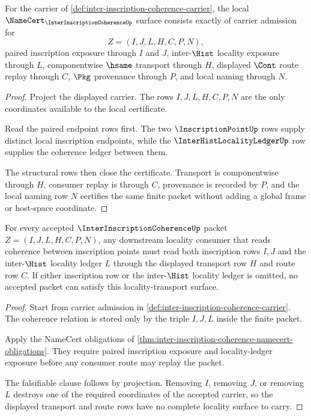 \begin{theorem}
\label{thm:inter-inscription-coherence-namecert-obligations}
For the carrier of \autoref{def:inter-inscription-coherence-carrier}, the local $\NameCert_{\InterInscriptionCoherenceUp}$ surface consists exactly of carrier admission for
$$
Z=(I,J,L,H,C,P,N),
$$
paired inscription exposure through $I$ and $J$, inter-$\Hist$ locality exposure through $L$, componentwise $\hsame$ transport through $H$, displayed $\Cont$ route replay through $C$, $\Pkg$ provenance through $P$, and local naming through $N$.
\end{theorem}
\begin{proof}
Project the displayed carrier. The rows $I,J,L,H,C,P,N$ are the only coordinates available to the local certificate.

Read the paired endpoint rows first. The two $\InscriptionPointUp$ rows supply distinct local inscription endpoints, while the $\InterHistLocalityLedgerUp$ row supplies the coherence ledger between them.

The structural rows then close the certificate. Transport is componentwise through $H$, consumer replay is through $C$, provenance is recorded by $P$, and the local naming row $N$ certifies the same finite packet without adding a global frame or host-space coordinate.
\end{proof}

\begin{theorem}
\label{thm:inter-inscription-coherence-locality-transport}
For every accepted $\InterInscriptionCoherenceUp$ packet $Z=(I,J,L,H,C,P,N)$, any downstream locality consumer that reads coherence between inscription points must read both inscription rows $I,J$ and the inter-$\Hist$ locality ledger $L$ through the displayed transport row $H$ and route row $C$. If either inscription row or the inter-$\Hist$ locality ledger is omitted, no accepted packet can satisfy this locality-transport surface.
\end{theorem}
\begin{proof}
Start from carrier admission in \autoref{def:inter-inscription-coherence-carrier}. The coherence relation is stored only by the triple $I,J,L$ inside the finite packet.

Apply the NameCert obligations of \autoref{thm:inter-inscription-coherence-namecert-obligations}. They require paired inscription exposure and locality-ledger exposure before any consumer route may replay the packet.

The falsifiable clause follows by projection. Removing $I$, removing $J$, or removing $L$ destroys one of the required coordinates of the accepted carrier, so the displayed transport and route rows have no complete locality surface to carry.
\end{proof}


